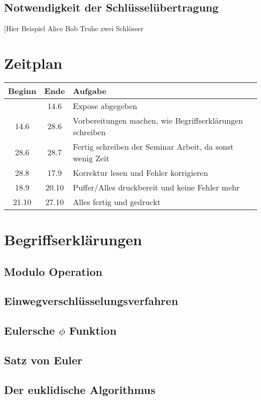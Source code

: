\documentclass[14pt,a4paper]{scrartcl}
\begin{document}
\subsection{Notwendigkeit der Schlüsselübertragung}
[Hier Beispiel Alice Bob Truhe zwei Schlösser



\section*{Zeitplan}

	\begin{tabular}{ c | c | p{10cm} }
	Beginn & Ende & Aufgabe\\
	 \hline

 & 14.6 & Expose abgegeben \\
14.6 & 28.6 & Vorbereitungen machen, wie Begriffserklärungen schreiben \\
28.6 & 28.7 & Fertig schreiben der Seminar Arbeit, da sonst wenig Zeit \\
28.8 & 17.9 & Korrektur lesen und Fehler korrigieren\\
18.9 & 20.10 & Puffer/Alles druckbereit und keine Fehler mehr\\
21.10 & 27.10 & Alles fertig und gedruckt
	\end{tabular}
	
	

\section{Begriffserklärungen}
	\subsection{Modulo Operation} %
	\subsection{Einwegverschlüsselungsverfahren}
	\subsection{Eulersche $\phi$ Funktion}
	\subsection{Satz von Euler}
	\subsection{Der euklidische Algorithmus}
\end{document}
